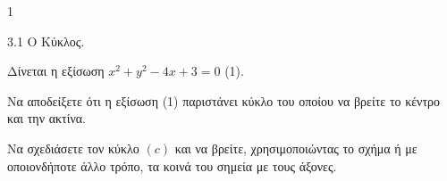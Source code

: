 \begin{ylh}{1}
    \item 3.1 Ο Κύκλος.
\end{ylh}
Δίνεται η εξίσωση $x^2 + y^2 - 4x + 3 = 0$ (1).
\begin{alist}
\item Να αποδείξετε ότι η εξίσωση (1) παριστάνει κύκλο του οποίου να βρείτε το κέντρο και την ακτίνα. 
\item Να σχεδιάσετε τον κύκλο $(c)$ και να βρείτε, χρησιμοποιώντας το σχήμα ή με οποιονδήποτε άλλο τρόπο, τα κοινά του σημεία με τους άξονες. 
\end{alist}